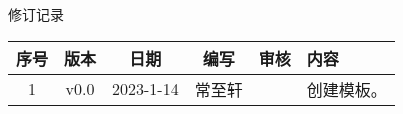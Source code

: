 \begin{center}
    {\heiti\Large 修订记录}
\end{center}
\begin{table}[!htbp]
    \centering
    \begin{tabular}{|c|c|c|c|c|p{8.5cm}|}
        \hline
        序号 & 版本 & 日期 & 编写 & 审核 & 内容 \\
        \hline
        1 & v0.0 & 2023-1-14 & 常至轩 & & 创建模板。 \\
        \hline
    \end{tabular}
\end{table}